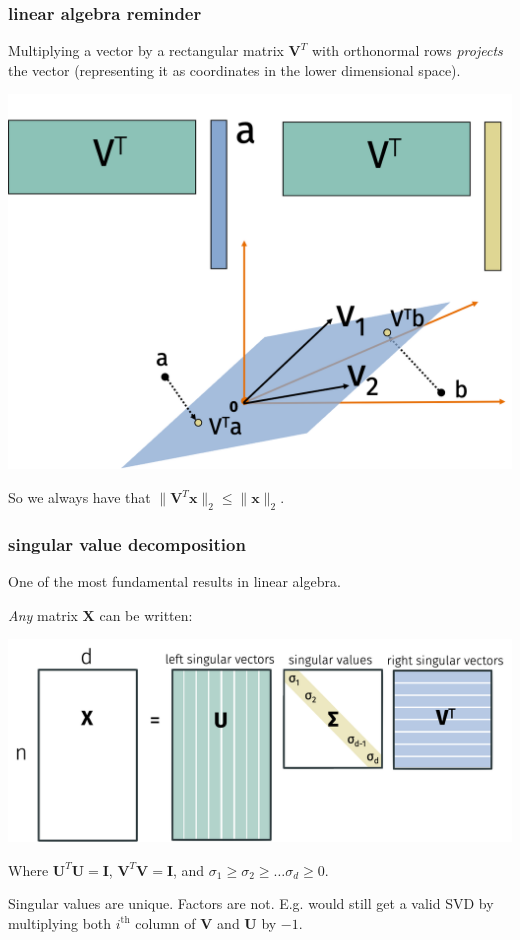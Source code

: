\documentclass[compress]{beamer}
\newcommand{\bv}[1]{\mathbf{#1}}
\begin{document}
\begin{frame}[t]
	\frametitle{linear algebra reminder}
	Multiplying a vector by a rectangular matrix $\bv{V}^T$ with orthonormal rows \emph{projects} the vector (representing it as coordinates in the lower dimensional space). 
	\begin{center}
		\includegraphics[width=.6\textwidth]{project.png}
	\end{center}
So we always have that $\|\bv{V}^T\bv{x}\|_2 \leq \|\bv{x}\|_2$.
\end{frame}

\begin{frame}
	\frametitle{singular value decomposition}
	\begin{center}
		\alert{One of the most fundamental results in linear algebra.}
	\end{center}
\vspace{-.5em}
	\emph{Any} matrix $\bv{X}$ can be written:
	\begin{center}
		\includegraphics[width=.9\textwidth]{svd.png}
	\end{center} 
	Where $\bv{U}^T\bv{U} = \bv{I}$,  $\bv{V}^T\bv{V} = \bv{I}$, and $\sigma_1 \geq \sigma_2 \geq \ldots \sigma_d \geq 0$. 
	

Singular values are unique. Factors are not. E.g. would still get a valid SVD by multiplying both $i^\text{th}$ column of $\bv{V}$ and $\bv{U}$ by $-1$.
\end{frame}
\end{document}
